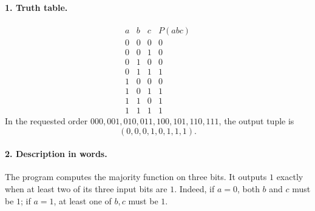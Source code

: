 \documentclass[UTF8,fontset=fandol,11pt,a4paper]{ctexart}
\begin{document}
\paragraph{1. Truth table.}
\[
\begin{array}{ccc|c}
 a&b&c&P(abc)\\
\hline
 0&0&0&0\\
 0&0&1&0\\
 0&1&0&0\\
 0&1&1&1\\
 1&0&0&0\\
 1&0&1&1\\
 1&1&0&1\\
 1&1&1&1
\end{array}
\]
In the requested order $000,001,010,011,100,101,110,111$, the output
tuple is
\[
 \boxed{(0,0,0,1,0,1,1,1).}
\]

\paragraph{2. Description in words.}
The program computes the majority function on three bits. It outputs
$1$ exactly when at least two of its three input bits are $1$.
Indeed, if $a=0$, both $b$ and $c$ must be $1$; if $a=1$, at least
one of $b,c$ must be $1$.
\end{document}
